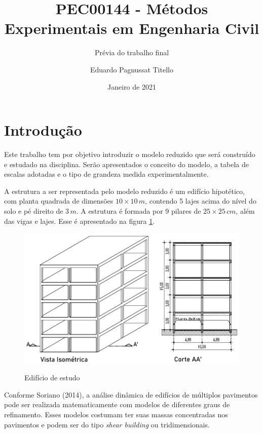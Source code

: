 

\author{Eduardo Pagnussat Titello}
\title{PEC00144 - Métodos Experimentais em Engenharia Civil}
\subtitle{Prévia do trabalho final}
\date{Janeiro de 2021}




\maketitle

\section{Introdução}
Este trabalho tem por objetivo introduzir o modelo reduzido que será construído e estudado na disciplina. Serão apresentados o conceito do modelo, a tabela de escalas adotadas e o tipo de grandeza medida experimentalmente.


A estrutura a ser representada pelo modelo reduzido é um edifício hipotético, com planta quadrada de dimensões $10 \times 10 \, m$, contendo 5 lajes acima do nível do solo e pé direito de $3 \, m$. A estrutura é formada por 9 pilares de $25 \times 25 \, cm$,  além das vigas e lajes. Esse é apresentado na figura \ref{fig:edfestudo}.


\begin{figure}
	\centering
	\caption{Edifício de estudo}
	\includegraphics[scale=0.9]{../Images/VistaeCorte}
	\label{fig:edfestudo}
\end{figure}


Conforme Soriano (2014), a análise dinâmica de edifícios de múltiplos pavimentos pode ser realizada matematicamente com modelos de diferentes graus de refinamento. Esses modelos costumam ter suas massas concentradas nos pavimentos e podem ser do tipo \textit{shear building} ou tridimensionais.

